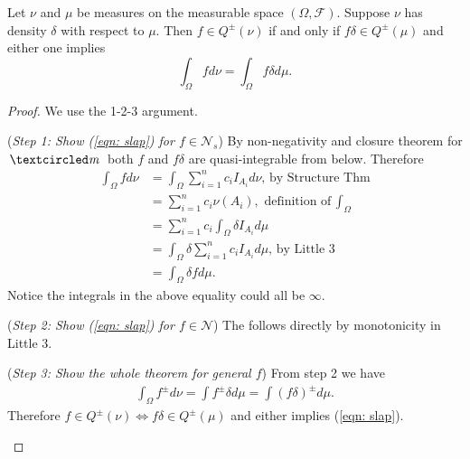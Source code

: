 \begin{theorem}[{\bf Slap in the density: $d\nu = \delta d\mu$}]
\label{thm: slap}
Let $\nu$ and $\mu$ be measures on the measurable space $(\Omega,\mathcal F)$. Suppose $\nu$ has density $\delta$ with respect to $\mu$.  Then $f\in Q^\pm(\nu)$ if and only if $f \delta \in Q^\pm(\mu)$ and either one implies
\begin{equation}
\label{eqn: slap}
\int_\Omega f d\nu = \int_\Omega f \delta d\mu.
\end{equation}
\end{theorem}
\begin{proof}
We use the 1-2-3 argument.

\begin{flushleft}
\textbullet({\sl Step 1: Show (\ref{eqn: slap}) for $f\in\mathscr N_s$}) By non-negativity and closure theorem for $\mcirc$ both $f$ and $f\delta$ are quasi-integrable from below. Therefore
\begin{align*}
\int_\Omega f d\nu
&= \int_\Omega \sum_{i=1}^n c_i I_{A_i} d\nu,\,\text{by Structure Thm}\\
&=  \sum_{i=1}^n  c_i\nu(A_i),\,\text{definition of $\int_\Omega$} \\
&=  \sum_{i=1}^n  c_i\int_\Omega \delta I_{A_i} d\mu \\
&=  \int_\Omega \delta \sum_{i=1}^n  c_iI_{A_i} d\mu,\,\text{by Little 3}\\
&=  \int_\Omega \delta f d\mu.
\end{align*}
Notice the integrals in the above equality could all be $\infty$.
\end{flushleft}


\begin{flushleft}
\textbullet({\sl Step 2: Show (\ref{eqn: slap}) for $f\in\mathscr N$}) The follows directly by monotonicity in Little 3.
\end{flushleft}


\begin{flushleft}
\textbullet({\sl Step 3: Show the whole theorem for general $f$})  From step 2 we have
\begin{align*}
\int_\Omega f^\pm d\nu = \int f^\pm \delta d\mu = \int (f\delta)^\pm d\mu.
\end{align*}
Therefore $f\in Q^\pm(\nu) \Longleftrightarrow f \delta \in Q^\pm(\mu)$ and either implies (\ref{eqn: slap}).
\end{flushleft}

\end{proof}


